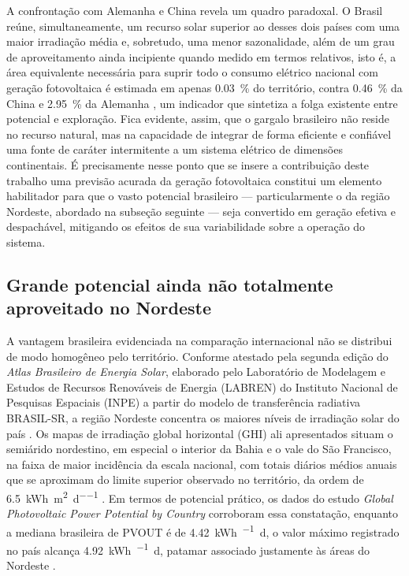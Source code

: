 A confrontação com Alemanha e China revela um quadro paradoxal. O Brasil reúne,
simultaneamente, um recurso solar superior ao desses dois países com uma maior
irradiação média e, sobretudo, uma menor sazonalidade, além de um grau de
aproveitamento ainda incipiente quando medido em termos relativos, isto é, a área
equivalente necessária para suprir todo o consumo elétrico nacional com geração
fotovoltaica é estimada em apenas \SI{0,03}{\percent} do território, contra
\SI{0,46}{\percent} da China e \SI{2,95}{\percent} da Alemanha
\cite{WorldBank2020}, um indicador que sintetiza a folga existente entre
potencial e exploração. Fica evidente, assim, que o gargalo brasileiro não
reside no recurso natural, mas na capacidade de integrar de forma eficiente e
confiável uma fonte de caráter intermitente a um sistema elétrico de dimensões
continentais. É precisamente nesse ponto que se insere a contribuição deste
trabalho uma previsão acurada da geração fotovoltaica constitui um elemento
habilitador para que o vasto potencial brasileiro --- particularmente o da
região Nordeste, abordado na subseção seguinte --- seja convertido em geração
efetiva e despachável, mitigando os efeitos de sua variabilidade sobre a
operação do sistema.

\subsection{Grande potencial ainda não totalmente aproveitado no Nordeste}
\label{subsec:potencial_nordeste}

A vantagem brasileira evidenciada na comparação internacional não se distribui
de modo homogêneo pelo território. Conforme atestado pela segunda edição do
\textit{Atlas Brasileiro de Energia Solar}, elaborado pelo Laboratório de
Modelagem e Estudos de Recursos Renováveis de Energia (LABREN) do Instituto
Nacional de Pesquisas Espaciais (INPE) a partir do modelo de transferência
radiativa BRASIL-SR, a região Nordeste concentra os maiores níveis de
irradiação solar do país \cite{Pereira2017}. Os mapas de irradiação global
horizontal (GHI) ali apresentados situam o semiárido nordestino, em especial o
interior da Bahia e o vale do São Francisco, na faixa de maior incidência da
escala nacional, com totais diários médios anuais que se aproximam do limite
superior observado no território, da ordem de \SI{6,5}{\kWh\per\square\metre\per\day}
\cite{Pereira2017}. Em termos de potencial prático, os dados do estudo
\textit{Global Photovoltaic Power Potential by Country} corroboram essa
constatação, enquanto a mediana brasileira de PVOUT é de
\SI{4,42}{\kWh\per\kWp\day}, o valor máximo registrado no país alcança
\SI{4,92}{\kWh\per\kWp\day}, patamar associado justamente às áreas do
Nordeste \cite{WorldBank2020}.

